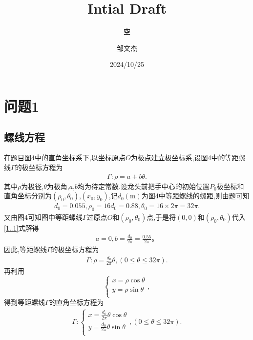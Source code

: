 \documentclass[lang=cn,newtx,10pt,scheme=chinese]{../Template/elegantbook}
\title{Intial Draft}
\subtitle{空}
\author{邹文杰}
\institute{无}
\date{2024/10/25}
\begin{document}
\maketitle

\frontmatter

\tableofcontents

\mainmatter


\chapter{问题1}

\section{螺线方程}

在题目图4中的直角坐标系下,以坐标原点\(O\)为极点建立极坐标系,设图4中的等距螺线\(\varGamma\)的极坐标方程为
\begin{align}\label{1..1}
\varGamma :\rho =a+b\theta.
\end{align}
其中\(\rho\)为极径,\(\theta\)为极角,\(a\),\(b\)均为待定常数.设龙头前把手中心的初始位置\(P_0\)极坐标和直角坐标分别为\((\rho _0,\theta _0)\),\((x_0,y_0)\),记\(d_0(\mathrm{m})\)为图4中等距螺线的螺距,则由题可知
\begin{align}
d_0 = 0.055,\rho _0 = 16d_0 = 0.88,\theta _0 = 16\times 2\pi = 32\pi.
\end{align}
又由图4可知图中等距螺线\(\varGamma\)过原点\(O\)和\((\rho _0,\theta _0)\)点,于是将\((0,0)\)和\((\rho _0,\theta _0)\)代入\eqref{1..1}式解得
\begin{align}
    a = 0,b = \frac{d_0}{2\pi}=\frac{0.55}{2\pi}。
\end{align}
因此,等距螺线\(\varGamma\)的极坐标方程为
\begin{align}
\varGamma :\rho =\frac{d_0}{2\pi}\theta ,(0\leqslant \theta \leqslant 32\pi) .\label{0.1}
\end{align}
再利用
\[\begin{cases}
x=\rho \cos \theta\\
y=\rho \sin \theta\\
\end{cases},\]
得到等距螺线\(\varGamma\)的直角坐标方程为
\begin{align}
\varGamma:\begin{cases}
x=\frac{d_0}{2\pi}\theta \cos \theta\\
y=\frac{d_0}{2\pi}\theta \sin \theta\\
\end{cases},(0\leqslant \theta \leqslant 32\pi) .\label{0.0}
\end{align}
\end{document}

